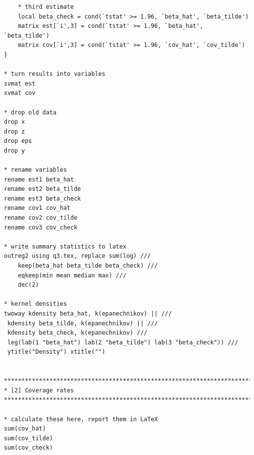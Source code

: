 \documentclass[12pt]{article}
\begin{document}
\begin{verbatim}
	* third estimate
	local beta_check = cond(`tstat' >= 1.96, `beta_hat', `beta_tilde')	
	matrix est[`i',3] = cond(`tstat' >= 1.96, `beta_hat', `beta_tilde')	
	matrix cov[`i',3] = cond(`tstat' >= 1.96, `cov_hat', `cov_tilde') 
}

* turn results into variables
svmat est
svmat cov

* drop old data
drop x
drop z
drop eps
drop y

* rename variables
rename est1 beta_hat
rename est2 beta_tilde
rename est3 beta_check
rename cov1 cov_hat
rename cov2 cov_tilde
rename cov3 cov_check

* write summary statistics to latex
outreg2 using q3.tex, replace sum(log) ///
	keep(beta_hat beta_tilde beta_check) ///
	eqkeep(min mean median max) ///
	dec(2)

* kernel densities
twoway kdensity beta_hat, k(epanechnikov) || ///
 kdensity beta_tilde, k(epanechnikov) || ///
 kdensity beta_check, k(epanechnikov) ///
 leg(lab(1 "beta_hat") lab(2 "beta_tilde") lab(3 "beta_check")) ///
 ytitle("Density") xtitle("")
	 

********************************************************************************
* [2] Coverage rates
********************************************************************************

* calculate these here, report them in LaTeX
sum(cov_hat)
sum(cov_tilde)
sum(cov_check)

\end{verbatim}
\end{document}
